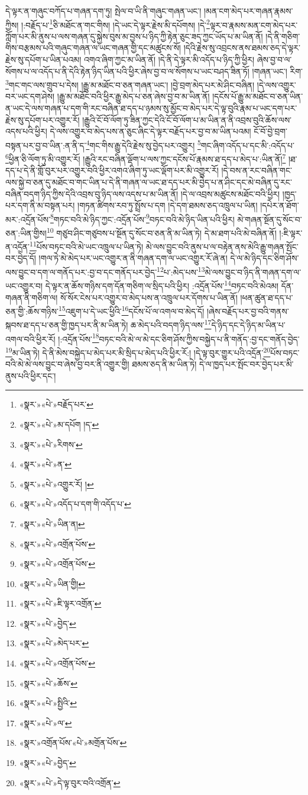 དེ་ལྟར་ན་གཞུང་བཀོད་པ་གཞན་དག་ཏུ། སྤེལ་བ་ཡི་ནི་གཞུང་གཞན་ཡང་། །མན་ངག་མེད་པར་གཞན་རྣམས་ཀྱིས། །:བརྗོད་པ་\footnote{«སྣར་»«པེ་»བརྗོད་པར་}ཅི་མཐོང་ན་གང་གིས། །དེ་ཡང་དེ་ལྟར་རྗེས་མི་དཔོགས། །དེ་\footnote{«སྣར་»«པེ་»མ་དཔོག །ད་}ལྟར་བ་རྣམས་མན་ངག་མེད་པར་ཀློག་པར་མི་ནུས་པ་ལས་གཞན་དུ་སྐྱེས་བུས་མ་བྱས་པ་ཉིད་ཀྱི་རྟེན་ཅུང་ཟད་ཀྱང་ཡོད་པ་མ་ཡིན་ནོ། །དེ་ནི་གཅིག་གིས་བརྩམས་པའི་གཞུང་གཞན་ལ་ཡང་གཞན་གྱི་དང་མཚུངས་སོ། །དེའི་རྗེས་སུ་འབྲངས་ནས་ཐམས་ཅད་དེ་ལྟར་རྗེས་སུ་དཔོག་པ་ཡིན་པའམ། འགའ་ཞིག་ཀྱང་མ་ཡིན་ནོ། །དེ་ནི་དེ་ལྟར་མི་འདོད་པ་ཉིད་ཀྱི་ཕྱིར། ཞེས་བྱ་བ་ལ་སོགས་པ་ལ་འདོད་པ་ནི་དེའི་རྟེན་ཉིད་ཡིན་པའི་ཕྱིར་ཞེས་བྱ་བ་ལ་སོགས་པ་ཡང་བཤད་ཟིན་ཏོ། །གཞན་ཡང་། རིག་\footnote{«སྣར་»«པེ་»རིགས་}གང་གང་ལས་གྲུབ་པ་དེས། །རྒྱུ་མ་མཐོང་བ་ཅན་གཞན་ཡང་། །བྱེ་བྲག་མེད་པར་མེ་ཤིང་བཞིན། །དེ་ལས་འགྱུར་བར་ཡང་དག་ཤེས། །རྒྱུ་མ་མཐོང་བའི་ཕྱིར་རྒྱུ་མེད་པ་ཅན་ཞེས་བྱ་བ་མ་ཡིན་ནོ། །དངོས་པོ་རྒྱུ་མ་མཐོང་བ་ཅན་ཡིན་ན་ཡང་དེ་ལས་གཞན་པ་དག་གི་རང་བཞིན་ཐ་དད་པ་ཉམས་སུ་མྱོང་བ་མེད་པར་དེ་ལྟ་བུའི་རྣམ་པ་ཡང་དག་པར་རྗེས་སུ་དཔོག་པར་འགྱུར་རོ། །རྒྱུའི་ངོ་བོ་ལོག་ཏུ་ཟིན་ཀྱང་དེའི་ངོ་བོ་ལོག་པ་མ་ཡིན་ན་ནི་འབྲས་བུའི་ཆོས་ལས་འདས་པའི་ཕྱིར། དེ་ལས་འགྱུར་བ་མེད་པས་ན་ཅུང་ཞིང་དེ་ལྟར་བརྗོད་པར་བྱ་བ་མ་ཡིན་པའམ། ངོ་བོ་བྱེ་བྲག་བསྟན་པར་བྱ་བ་ཡིན་:ན་ནི་ད་\footnote{«སྣར་»«པེ་»ན་}གང་གིས་རྒྱུ་དེའི་རྗེས་སུ་བྱེད་པར་འགྱུར། \footnote{«སྣར་»«པེ་»འགྱུར་རོ། ། }གང་ཞིག་འདོད་པ་དང་མི་:འདོད་པ་\footnote{«སྣར་»«པེ་»འདོད་པ་དག་གི་འདོད་པ་}ཕྱིན་ཅི་ལོག་ཏུ་མི་འགྱུར་རོ། །རྒྱུའི་རང་བཞིན་ལྡོག་པ་ལས་ཀྱང་དངོས་པོ་རྣམས་ཐ་དད་པ་མེད་པ་:ཡིན་ནོ།\footnote{«སྣར་»«པེ་»ཡིན་ན།} །ཐ་དད་པ་དེ་ནི་གློ་བུར་པར་འགྱུར་བའི་ཕྱིར་འགའ་ཞིག་ཏུ་ཡང་ལྡོག་པར་མི་འགྱུར་རོ། །དེ་བས་ན་རང་བཞིན་གང་ལས་སྐྱེ་བ་ཅན་དུ་མཐོང་བ་གང་ཡིན་པ་དེ་ནི་གཞན་ལ་ཡང་ཐ་དད་པར་མི་བྱེད་པ་ན་ཤིང་དང་མེ་བཞིན་དུ་རང་བཞིན་བདག་ཉིད་ཀྱིས་དེའི་འབྲས་བུ་ཉིད་ལས་འདས་པ་མ་ཡིན་ནོ། །དེ་ལ་འབྲས་མཚུངས་མཐོང་བའི་ཕྱིར། །ཁྱད་པར་དག་ནི་མ་བསྟན་པར། །གཏན་ཚིགས་རབ་ཏུ་སྤྲོས་པ་དག །དེ་དག་ཐམས་ཅད་འཁྲུལ་པ་ཡིན། །དཔེར་ན་ཐོག་མར་:འདྲོན་པོས་\footnote{«སྣར་»«པེ་»འགྲོན་པོས་}གཏང་བའི་མེ་ཉིད་ཀྱང་:འདྲོན་པོས་\footnote{«སྣར་»«པེ་»འགྲོན་པོས་}བཏང་བའི་མེ་ཉིད་ཡིན་པའི་ཕྱིར། མེ་གཞན་སྔོན་དུ་སོང་བ་ཅན་:ཡིན་གྱིས།\footnote{«སྣར་»«པེ་»ཡིན་གྱི།} གཙུབ་ཤིང་གཙུབས་པ་སྔོན་དུ་སོང་བ་ཅན་ནི་མ་ཡིན་ཏེ། དེ་མ་ཐག་པའི་མེ་བཞིན་ནོ། །:ཇི་ལྟར་ན་འདྲོན་\footnote{«སྣར་»«པེ་»ཇི་ལྟར་འགྲོན་}པོས་བཏང་བའི་མེ་ཡང་འཁྲུལ་པ་ཡིན་ཏེ། མེ་ལས་བྱུང་བའི་ནུས་པ་ལ་བརྟེན་ནས་མེའི་རྒྱུ་གཞན་སྤོང་བར་བྱེད་དོ། །གལ་ཏེ་མེ་མེད་པར་ཡང་འགྱུར་ན་ནི་གཞན་དག་ལ་ཡང་འགྱུར་རོ་ཞེ་ན། དེ་ལ་མེ་ཉིད་དང་ཅིག་ཤོས་ལས་བྱུང་བ་དག་ལ་གནོད་པར་:བྱ་བ་དང་གནོད་པར་བྱེད་\footnote{«སྣར་»«པེ་»བྱེད་}པ་:མེད་པས་\footnote{«སྣར་»«པེ་»མེད་པར་}མེ་ལས་བྱུང་བ་ཉིད་ནི་གཞན་དག་ལ་ཡང་འགྱུར་བ། དེ་ལྟར་ན་ཆོས་གཉིས་དག་དོན་གཅིག་ལ་སྲིད་པའི་ཕྱིར། :འདྲོན་པོས་\footnote{«སྣར་»«པེ་»འགྲོན་པོས་}བཏང་བའི་མེའམ། དོན་གཞན་ནི་གཅིག་ལ། སོ་སོར་ངེས་པར་འགྱུར་བ་མེད་པས་ན་འཁྲུལ་པར་དོགས་པ་ཡིན་ནོ། །ཕན་ཚུན་ཐ་དད་པ་ཅན་གྱི་:ཆོས་གཉིས་\footnote{«སྣར་»«པེ་»ཆོས་}འཇུག་པ་དེ་ཡང་ཕྱིའི་\footnote{«སྣར་»«པེ་»སྤྱིའི་}དངོས་པོ་ལ་འགལ་བ་མེད་དོ། །ཞེས་བརྗོད་པར་བྱ་བའི་གནས་སྐབས་ཐ་དད་པ་ཅན་གྱི་ཁྱད་པར་ནི་མ་ཡིན་ཏེ། ཆ་མེད་པའི་བདག་ཉིད་ལས་\footnote{«སྣར་»«པེ་»ལ་}དེ་ཉིད་དང་དེ་ཉིད་མ་ཡིན་པ་འགལ་བའི་ཕྱིར་རོ། །:འདྲོན་པོས་\footnote{«སྣར་»འགྲོན་པོས་«པེ་»མགྲོན་པོས་}བཏང་བའི་མེ་ལ་མེ་དང་ཅིག་ཤོས་ཀྱིས་བསྐྱེད་པ་ནི་གནོད་:བྱ་དང་གནོད་བྱེད་\footnote{«སྣར་»«པེ་»བྱེད་}མ་ཡིན་ཏེ། དེ་ནི་མེས་བསྐྱེད་པ་མེད་པར་མི་སྲིད་པ་མེད་པའི་ཕྱིར་རོ:། །དེ་ལྟ་བུར་གྱུར་པའི་འདྲོན་\footnote{«སྣར་»«པེ་»དེ་ལྟ་བུར་བའི་འགྲོན་}པོས་བཏང་བའི་མེ་མེ་ལས་བྱུང་བ་ཞེས་བྱ་བར་ནི་འགྱུར་གྱི། ཐམས་ཅད་ནི་མ་ཡིན་ཏེ། དེ་ལ་ཁྱད་པར་སྤོང་བར་བྱེད་པར་མི་ནུས་པའི་ཕྱིར་དང་། 